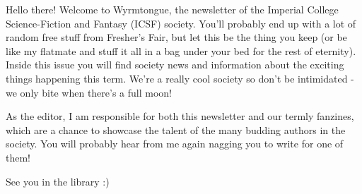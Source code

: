 Hello there! Welcome to Wyrmtongue, the newsletter of the Imperial College Science-Fiction and Fantasy (ICSF) society. You'll probably end up with a lot of random free stuff from Fresher's Fair, but let this be the thing you keep (or be like my flatmate and stuff it all in a bag under your bed for the rest of eternity). Inside this issue you will find society news and information about the exciting things happening this term. We're a really cool society so don't be intimidated - we only bite when there's a full moon!

As the editor, I am responsible for both this newsletter and our termly fanzines, which are a chance to showcase the talent of the many budding authors in the society. You will probably hear from me again nagging you to write for one of them!
 
 See you in the library :)
